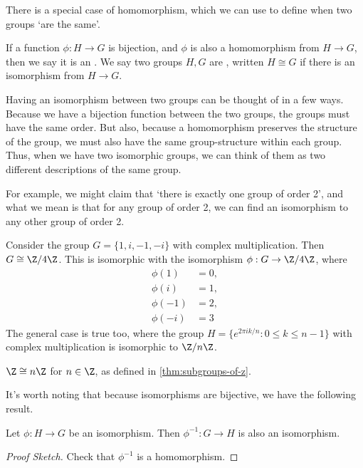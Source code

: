 There is a special case of homomorphism, which we can use to define when two groups `are the same'.

\begin{definition}[Isomorphism]
	If a function $\phi : H \rightarrow G$ is bijection, and $\phi$ is also a homomorphism from $H \rightarrow G$, then we say it is an . We say two groups $H, G$ are , written $H \cong G$ if there is an isomorphism from $H \rightarrow G$.
\end{definition}

Having an isomorphism between two groups can be thought of in a few ways. Because we have a bijection function between the two groups, the groups must have the same order. But also, because a homomorphism preserves the structure of the group, we must also have the same group-structure within each group. Thus, when we have two isomorphic groups, we can think of them as two different descriptions of the same group.

For example, we might claim that `there is exactly one group of order 2', and what we mean is that for any group of order 2, we can find an isomorphism to any other group of order 2. 

\begin{example}
	Consider the group $G = \{ 1, i, -1, -i \}$ with complex multiplication. Then $G \cong \Z / 4 \Z$. This is isomorphic with the isomorphism $\phi : G \rightarrow \Z / 4 \Z$, where
	\begin{align*}
		\phi(1) &= 0, \\
		\phi(i) &= 1, \\
		\phi(-1) &= 2, \\
		\phi(-i) &= 3
	\end{align*}
	The general case is true too, where the group $H = \{  e^{2 \pi i k/n} : 0 \leq k \leq n - 1 \}$ with complex multiplication is isomorphic to $\Z /n \Z$.
\end{example}

\begin{example}
	$\Z \cong n \Z$ for $n \in \Z$, as defined in \autoref{thm:subgroups-of-z}. 
\end{example}

It's worth noting that because isomorphisms are bijective, we have the following result.

\begin{proposition}
	Let $\phi : H \rightarrow G$ be an isomorphism. Then $\phi^{-1} : G \rightarrow H$ is also an isomorphism.
\end{proposition}
\begin{proof}[Proof Sketch]
	Check that $\phi^{-1}$ is a homomorphism.
\end{proof}

